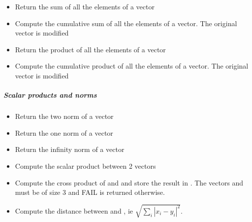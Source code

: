 \begin{itemize}
\item {}
  \sshortdescribe Return the sum of all the elements of a vector  

\item {}
  \sshortdescribe Compute the cumulative sum of all the elements of a
  vector. The original vector is modified

\item {}
  \sshortdescribe Return the product of all the elements of a vector  

\item {}
  \sshortdescribe Compute the cumulative product of all the elements of a
  vector. The original vector is modified
\end{itemize}

\subparagraph{Scalar products and norms}
\begin{itemize}
\item {}
  \sshortdescribe Return the two norm of a vector  

\item {}
  \sshortdescribe Return the one norm of a vector  

\item {}
  \sshortdescribe Return the infinity norm of a vector  

\item {} 
  \sshortdescribe Compute the scalar product between 2 vectors  
\item {}
  \sshortdescribe Compute the cross product of  and  and store the
  result in . The vectors  and  must be of size 3 and
  FAIL is returned otherwise.

\item {}
  \sshortdescribe Compute the distance between  and , ie
  $\sqrt{\sum_i |x_i - y_i|^2}$.

\end{itemize}


